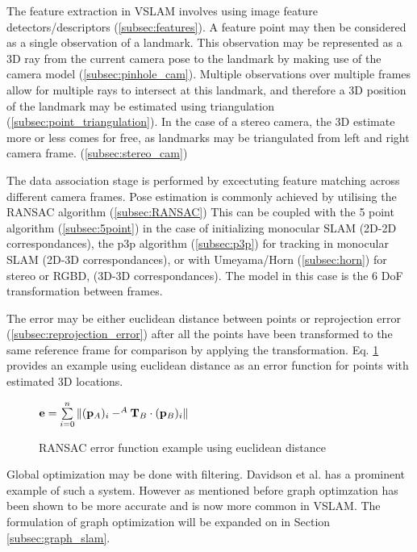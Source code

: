 The feature extraction in VSLAM involves using image feature detectors/descriptors (\ref{subsec:features}).  A feature point may then be considered as a single observation of a landmark.  This observation may be represented as a 3D ray from the current camera pose to the landmark by making use of the camera model (\ref{subsec:pinhole_cam}).  Multiple observations over multiple frames allow for multiple rays to intersect at this landmark, and therefore a 3D position of the landmark may be estimated using triangulation (\ref{subsec:point_triangulation}). In the case of a stereo camera, the 3D estimate more or less comes for free, as landmarks may be triangulated from left and right camera frame. (\ref{subsec:stereo_cam})

The data association stage is performed by excectuting feature matching across different camera frames. Pose estimation is commonly achieved by utilising the RANSAC algorithm (\ref{subsec:RANSAC}) This can be coupled with the 5 point algorithm (\ref{subsec:5point}) in the case of initializing monocular SLAM (2D-2D correspondances), the p3p algorithm (\ref{subsec:p3p}) for tracking in monocular SLAM (2D-3D correspondances), or with Umeyama/Horn (\ref{subsec:horn}) for stereo or RGBD, (3D-3D correspondances). The model in this case is the 6 DoF transformation between frames. 

The error may be either euclidean distance between points or reprojection error (\ref{subsec:reprojection_error}) after all the points have been transformed to the same reference frame for comparison by applying the transformation. Eq. \ref{eq:ransac_error} provides an example using euclidean distance as an error function for points with estimated 3D locations.

\begin{figure}[h]
 \centering
 \begin{math}
  \mathbf{e} = \sum\limits_{i=0}^n \| (\mathbf p_A)_i - ^A\mathbf T_B \cdot (\mathbf p_B)_i \|
 \end{math}
 \caption{RANSAC error function example using euclidean distance}
 \label{eq:ransac_error}
\end{figure}

Global optimization may be done with filtering.  Davidson et al. has a prominent example of such a system.  However as mentioned before graph optimzation has been shown to be more accurate and is now more common in VSLAM.  The formulation of graph optimization will be expanded on in Section \ref{subsec:graph_slam}.


